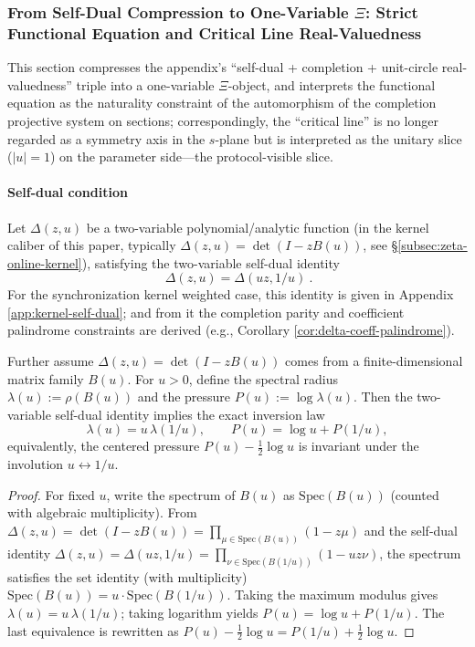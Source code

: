 \subsubsection{From Self-Dual Compression to One-Variable \texorpdfstring{$\Xi$}{Xi}: Strict Functional Equation and Critical Line Real-Valuedness}\label{subsec:xi-from-self-dual}
This section compresses the appendix's ``self-dual + completion + unit-circle real-valuedness'' triple into a one-variable \(\Xi\)-object, and interprets the functional equation as the naturality constraint of the automorphism of the completion projective system on sections; correspondingly, the ``critical line'' is no longer regarded as a symmetry axis in the \(s\)-plane but is interpreted as the unitary slice (\(|u|=1\)) on the parameter side---the protocol-visible slice.

\paragraph{Self-dual condition}
Let \(\Delta(z,u)\) be a two-variable polynomial/analytic function (in the kernel caliber of this paper, typically
\(\Delta(z,u)=\det(I-zB(u))\), see \S\ref{subsec:zeta-online-kernel}), satisfying the two-variable self-dual identity
\[
\boxed{\ \Delta(z,u)=\Delta(uz,1/u)\ }.
\]
For the synchronization kernel weighted case, this identity is given in Appendix \ref{app:kernel-self-dual}; and from it the completion parity and coefficient palindrome constraints are derived (e.g., Corollary \ref{cor:delta-coeff-palindrome}).

\begin{corollary}\label{cor:xi-selfdual-pressure-inversion}
Further assume \(\Delta(z,u)=\det(I-zB(u))\) comes from a finite-dimensional matrix family \(B(u)\).
For \(u>0\), define the spectral radius \(\lambda(u):=\rho(B(u))\) and the pressure \(P(u):=\log\lambda(u)\).
Then the two-variable self-dual identity implies the exact inversion law
\[
\lambda(u)=u\,\lambda(1/u),
\qquad
P(u)=\log u+P(1/u),
\]
equivalently, the centered pressure \(P(u)-\tfrac12\log u\) is invariant under the involution \(u\leftrightarrow 1/u\).
\end{corollary}
\begin{proof}
For fixed \(u\), write the spectrum of \(B(u)\) as \(\mathrm{Spec}(B(u))\) (counted with algebraic multiplicity).
From \(\Delta(z,u)=\det(I-zB(u))=\prod_{\mu\in\mathrm{Spec}(B(u))}(1-z\mu)\) and the self-dual identity
\(\Delta(z,u)=\Delta(uz,1/u)=\prod_{\nu\in\mathrm{Spec}(B(1/u))}(1-uz\nu)\),
the spectrum satisfies the set identity (with multiplicity)
\(
\mathrm{Spec}(B(u))=u\cdot \mathrm{Spec}(B(1/u))
\).
Taking the maximum modulus gives \(\lambda(u)=u\,\lambda(1/u)\); taking logarithm yields \(P(u)=\log u+P(1/u)\).
The last equivalence is rewritten as
\(
P(u)-\tfrac12\log u=P(1/u)+\tfrac12\log u
\).
\end{proof}

